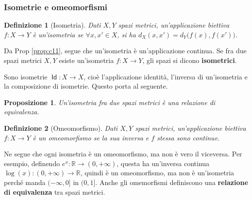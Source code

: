 \documentclass[11pt, a4paper]{scrartcl}
\theoremstyle{style1}
\newtheorem{prop}{Proposizione}[section]
\newtheorem{definizione}{Definizione}[section]
\numberwithin{equation}{subsection}
\renewcommand{\operatorname}[1]{\mathop{\mathrm{\textsf{#1}}}}
\begin{document}
\subsubsection{Isometrie e omeomorfismi}
\begin{definizione}
	[Isometria]
	Dati $X,Y$ spazi metrici, un'applicazione biettiva $f:X\to Y$ \`e un'isometria se $\forall x,x' \in X$, si ha $d_X(x,x') = d_Y\big(f(x),f(x')\big)$.
\end{definizione}
\noindent Da Prop \ref{prop:c11}, segue che un'isometria \`e un'applicazione continua. Se fra due spazi metrici $X,Y$ esiste un'isometria $f:X\to Y$, gli spazi si dicono \textbf{isometrici}. 

Sono isometrie $\operatorname{Id} : X \to X$, cio\`e l'applicazione identit\`a, l'inversa di un'isometria e la composizione di isometrie. Questo porta al seguente.
\begin{prop}
	Un'isometria fra due spazi metrici \`e una relazione di equivalenza.	
\end{prop}
\begin{definizione}
	[Omeomorfismo]
	Dati $X,Y$ spazi metrici, un'applicazione biettiva $f:X\to Y$ \`e un \textit{omeomorfismo} se la sua inversa e $f$ stessa sono continue.
\end{definizione}
\noindent Ne segue che ogni isometria \`e un omeomorfismo, ma non \`e vero il viceversa. Per esempio, definendo $e^x : \mathbb{R} \to (0,+\infty)$, questa ha un'inversa continua $\log(x) : (0,+\infty) \to \mathbb{R}$, quindi \`e un omeomorfismo, ma non \`e un'isometria perch\'e manda $(-\infty,0]$ in $(0,1]$.
Anche gli omemorfismi definiscono una \textbf{relazione di equivalenza} tra spazi metrici.
\end{document}
